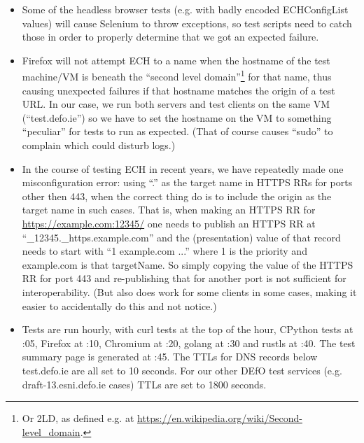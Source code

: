 \begin{itemize}

    \item Some of the headless browser tests (e.g. with badly encoded
        ECHConfigList values) will cause Selenium to throw exceptions, so test
        scripts need to catch those in order to properly determine that we got
        an expected failure.

    \item Firefox will not attempt ECH to a name when the hostname of the test
        machine/VM is beneath the ``second level domain''\footnote{Or 2LD, as
        defined e.g. at
        \url{https://en.wikipedia.org/wiki/Second-level_domain}.} for that
        name, thus causing unexpected failures if that hostname matches the
        origin of a test URL. In our case, we run both servers and test clients
        on the same VM (``test.defo.ie'') so we have to set the hostname on the
        VM to something ``peculiar'' for tests to run as expected. (That of
        course causes ``sudo'' to complain which could disturb logs.)

    \item In the course of testing ECH in recent years, we have repeatedly made
        one misconfiguration error: using ``.'' as the target name in HTTPS RRs
        for ports other then 443, when the correct thing do is to include the
        origin as the target name in such cases. That is, when making an HTTPS
        RR for \url{https://example.com:12345/} one needs to publish an HTTPS
        RR at ``\_12345.\_https.example.com'' and the (presentation) value of
        that record needs to start with ``1 example.com ...'' where 1 is the
        priority and example.com is that targetName. So simply copying the
        value of the HTTPS RR for port 443 and re-publishing that for another
        port is not sufficient for interoperability. (But also does work for
        some clients in some cases, making it easier to accidentally do this
        and not notice.)

    \item Tests are run hourly, with curl tests at the top of the hour,
        CPython tests at :05, Firefox at :10, Chromium at :20, golang at :30
        and rustls at :40. The test summary page is generated at :45.
        The TTLs for DNS records below test.defo.ie are all set to 10 seconds.
        For our other DEfO test services (e.g. draft-13.esni.defo.ie cases)
        TTLs are set to 1800 seconds.

\end{itemize}

